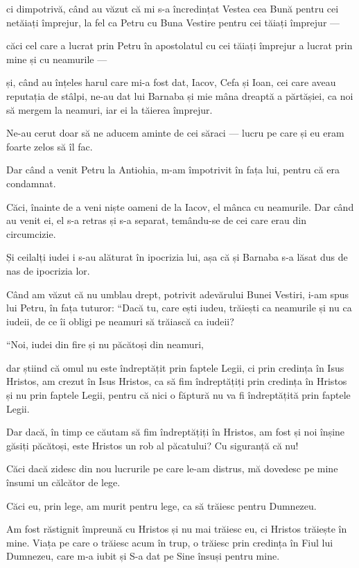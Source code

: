{ci dimpotrivă, când au văzut că mi s-a încredințat Vestea cea Bună pentru cei netăiați împrejur, la fel ca Petru cu Buna Vestire pentru cei tăiați împrejur —

căci cel care a lucrat prin Petru în apostolatul cu cei tăiați împrejur a lucrat prin mine și cu neamurile —

și, când au înțeles harul care mi-a fost dat, Iacov, Cefa și Ioan, cei care aveau reputația de stâlpi, ne-au dat lui Barnaba și mie mâna dreaptă a părtășiei, ca noi să mergem la neamuri, iar ei la tăierea împrejur.

Ne-au cerut doar să ne aducem aminte de cei săraci — lucru pe care și eu eram foarte zelos să îl fac.


\par }{\PP {}Dar când a venit Petru la Antiohia, m-am împotrivit în fața lui, pentru că era condamnat.

Căci, înainte de a veni niște oameni de la Iacov, el mânca cu neamurile. Dar când au venit ei, el s-a retras și s-a separat, temându-se de cei care erau din circumcizie.

Și ceilalți iudei i s-au alăturat în ipocrizia lui, așa că și Barnaba s-a lăsat dus de nas de ipocrizia lor.

Când am văzut că nu umblau drept, potrivit adevărului Bunei Vestiri, i-am spus lui Petru, în fața tuturor: “Dacă tu, care ești iudeu, trăiești ca neamurile și nu ca iudeii, de ce îi obligi pe neamuri să trăiască ca iudeii?


\par }{\PP {}“Noi, iudei din fire și nu păcătoși din neamuri,

dar știind că omul nu este îndreptățit prin faptele Legii, ci prin credința în Isus Hristos, am crezut în Isus Hristos, ca să fim îndreptățiți prin credința în Hristos și nu prin faptele Legii, pentru că nici o făptură nu va fi îndreptățită prin faptele Legii.

Dar dacă, în timp ce căutam să fim îndreptățiți în Hristos, am fost și noi înșine găsiți păcătoși, este Hristos un rob al păcatului? Cu siguranță că nu!

Căci dacă zidesc din nou lucrurile pe care le-am distrus, mă dovedesc pe mine însumi un călcător de lege.

Căci eu, prin lege, am murit pentru lege, ca să trăiesc pentru Dumnezeu.

Am fost răstignit împreună cu Hristos și nu mai trăiesc eu, ci Hristos trăiește în mine. Viața pe care o trăiesc acum în trup, o trăiesc prin credința în Fiul lui Dumnezeu, care m-a iubit și S-a dat pe Sine însuși pentru mine.

}

